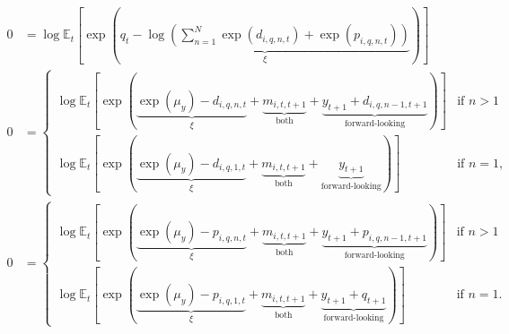\documentclass[12 pt, oneside]{article}
\theoremstyle{definition}
\theoremstyle{definition}
\theoremstyle{definition}
\newcommand{\E}{\mathbb{E}}
\begin{document}
\begin{align}
  0 & = \log\E_t\left[\exp\left(\underbrace{q_t - \log\left(\sum_{n = 1}^{N}\exp(d_{i, q, n, t}) + \exp(p_{i, q, n, t})\right)}_{\xi}\right)\right]\\
  0 & =
      \begin{cases}
        \log\E_t\left[\exp\left(\underbrace{\exp(\mu_y) - d_{i, q, n, t}}_{\xi} + \underbrace{m_{i, t, t + 1}}_{\text{both}} + \underbrace{y_{t + 1} +  d_{i, q, n - 1, t + 1}}_{\text{forward-looking}}\right)\right] & \text{if } n > 1\\
        \log\E_t\left[\exp\left(\underbrace{\exp(\mu_y) - d_{i, q, 1, t}}_{\xi} + \underbrace{m_{i, t, t + 1}}_{\text{both}} + \underbrace{y_{t + 1}}_{\text{forward-looking}} \right)\right] & \text{if } n = 1,
      \end{cases}\\
  0 & =
      \begin{cases}
        \log\E_t\left[\exp\left(\underbrace{\exp(\mu_y) - p_{i, q, n, t}}_{\xi} + \underbrace{m_{i, t, t + 1}}_{\text{both}} + \underbrace{y_{t + 1} + p_{i, q, n - 1, t + 1}}_{\text{forward-looking}} \right)\right] & \text{if } n > 1\\
        \log\E_t\left[\exp\left(\underbrace{\exp(\mu_y) - p_{i, q, 1, t}}_{\xi} + \underbrace{m_{i, t, t + 1}}_{\text{both}} + \underbrace{y_{t + 1} + q_{t + 1}}_{\text{forward-looking}}\right)\right] & \text{if }n = 1.
      \end{cases}
\end{align}
\end{document}
